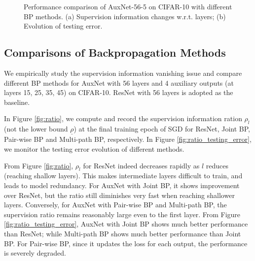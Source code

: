 \documentclass[10pt,onecolumn,letterpaper]{article}
\def\SexyName{AuxNet\xspace}
\begin{document}
\begin{figure}[t]
\centering



\caption{Performance comparison of \SexyName-56-5 on CIFAR-10 with different BP methods. (a) Supervision information changes w.r.t. layers; (b) Evolution of testing error.}\label{fig:grad}
\vspace{-0.8em}
\end{figure}


\subsection{Comparisons of Backpropagation Methods }\label{sec:bpcomparision}
We empirically study the supervision information vanishing issue and compare different BP methods for \SexyName with 56 layers and 4 auxiliary outputs (at layers 15, 25, 35, 45) on CIFAR-10. ResNet with 56 layers is adopted as the baseline.

In Figure \ref{fig:ratio}, we compute and record the supervision information ration $\rho_l$ (not the lower bound $\underline{\rho}$) at the
final training epoch of SGD for ResNet, Joint BP, Pair-wise BP and Multi-path BP, respectively. In Figure \ref{fig:ratio_testing_error}, we monitor the testing error evolution of different methods.

From Figure \ref{fig:ratio}, $\rho_l$ for ResNet indeed decreases rapidly as $l$ reduces (reaching shallow layers). This makes intermediate layers difficult to train, and leads to model redundancy. For \SexyName with Joint BP, it shows improvement over ResNet, but the ratio still diminishes very fast when reaching shallower layers. Conversely, for \SexyName with  Pair-wise BP and Multi-path BP, the supervision ratio remains reasonably large even to the first layer. From Figure \ref{fig:ratio_testing_error}, \SexyName with Joint BP  shows much better performance than ResNet; while Multi-path BP shows much better performance than Joint BP. For Pair-wise BP, since it updates the loss for each output, the performance is severely degraded. %
\end{document}
